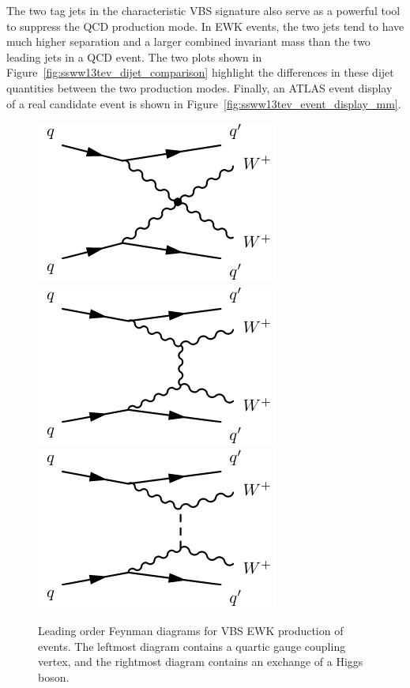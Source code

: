 The two tag jets in the characteristic VBS signature also serve as a powerful tool to suppress the QCD production mode.
In EWK events, the two jets tend to have much higher separation and a larger combined invariant mass than the two leading jets in a QCD event.
The two plots shown in Figure~\ref{fig:ssww13tev_dijet_comparison} highlight the differences in these dijet quantities between the two production modes.
Finally, an ATLAS event display of a real \ssww candidate event is shown in Figure~\ref{fig:ssww13tev_event_display_mm}.

\begin{figure}[htbp]
  \centering
  \includegraphics[width=.32\textwidth]{figs/ssww_13tev/diagrams/vbs1}
  \includegraphics[width=.32\textwidth]{figs/ssww_13tev/diagrams/vbs2}
  \includegraphics[width=.32\textwidth]{figs/ssww_13tev/diagrams/vbs3}
  \caption{Leading order Feynman diagrams for VBS EWK production of \ssww events. The leftmost diagram contains a quartic gauge coupling vertex, and the rightmost diagram contains an exchange of a Higgs boson.}
  \label{fig:ssww13tev_diagrams_vbs_ssww}
\end{figure}

